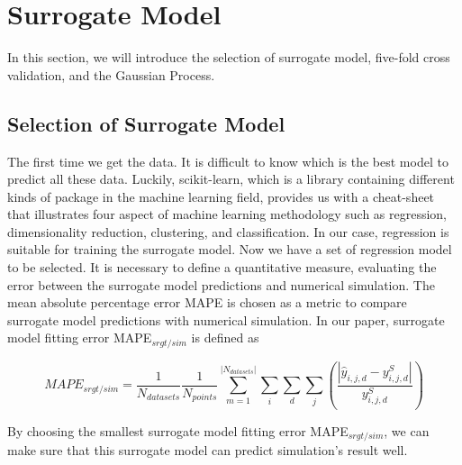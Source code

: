 \section{Surrogate Model}
In this section, we will introduce the selection of surrogate model, five-fold cross validation, and the Gaussian Process. 

\subsection{Selection of Surrogate Model}
The first time we get the data. It is difficult to know which is the best model to predict all these data. Luckily, scikit-learn, which is a library containing different kinds of package in the machine learning field, provides us with a cheat-sheet that illustrates four aspect of machine learning methodology such as regression, dimensionality reduction, clustering, and classification. In our case, regression is suitable for training the surrogate model. Now we have a set of regression model to be selected. It is necessary to define a quantitative measure, evaluating the error between the surrogate model predictions and numerical simulation. The mean absolute percentage error MAPE is chosen as a metric to compare surrogate model predictions with numerical simulation. In our paper, surrogate model fitting error MAPE$_{srgt/sim}$ is defined as 

\begin{equation}
\label{srgt/sim}
MAPE_{srgt/sim}=\frac{1}{N_{datasets}}\frac{1}{N_{points}}\sum_{m=1}^{\left | N_{datasets} \right |}\sum_{i}\sum_{d}\sum_{j}\left ( \frac{\left |\hat{y}_{i,j,d}-y_{i,j,d}^S \right |}{y_{i,j,d}^S} \right )
\end{equation}

By choosing the smallest surrogate model fitting error MAPE$_{srgt/sim}$, we can make sure that this surrogate model can predict simulation's result well. 

